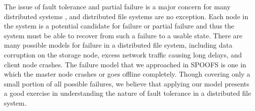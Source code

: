The issue of fault tolerance and partial failure is a major concern for many distributed systems \cite{waldo_note94}, and distributed file systems are no exception.  Each node in the system is a potential candidate for failure or partial failure and thus the system must be able to recover from such a failure to a usable state.  There are many possible models for failure in a distributed file system, including data corruption on the storage node, excess network traffic causing long delays, and client node crashes.  The failure model that we approached in SPOOFS is one in which the master node crashes or goes offline completely.  Though covering only a small portion of all possible failures, we believe that applying our model presents a good exercise in understanding the nature of fault tolerance in a distributed file system.
